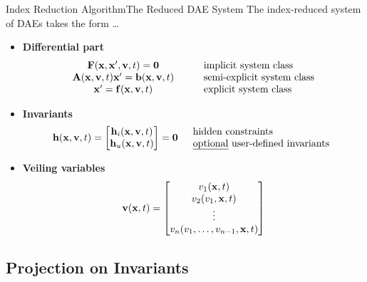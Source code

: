 \begin{frame}{Index Reduction Algorithm}{The Reduced \acs{DAE} System}
  The index-reduced system of \acsp{DAE} takes the form \dots
  \begin{itemize}[<+->]
    \item \textbf{Differential part}
    \begin{equation*}
      \begin{array}{ccl}
          \mathbf{F}(\mathbf{x}, \mathbf{x}^\prime, \mathbf{v}, t) = \mathbf{0} & \quad & \text{implicit  system class} \\
          \mathbf{A}(\mathbf{x}, \mathbf{v}, t) \mathbf{x}^\prime = \mathbf{b}(\mathbf{x}, \mathbf{v}, t) & \quad & \text{semi-explicit system class} \\
          \mathbf{x}^\prime = \mathbf{f}(\mathbf{x}, \mathbf{v}, t) & \quad & \text{explicit system class}
      \end{array}
    \end{equation*}
    \item \textbf{Invariants}
    \begin{equation*}
      \mathbf{h}(\mathbf{x}, \mathbf{v}, t) = \begin{bmatrix}
          \mathbf{h}_{i}(\mathbf{x}, \mathbf{v}, t) \\
          \mathbf{h}_{u}(\mathbf{x}, \mathbf{v}, t)
      \end{bmatrix} = \mathbf{0} \quad \begin{array}{l}
        \text{hidden constraints} \\
        \text{\emph{optional} user-defined invariants}
        \end{array}
    \end{equation*}
    \item \textbf{Veiling variables}
    \begin{equation*}
        \mathbf{v}(\mathbf{x}, t) = \begin{bmatrix}
            v_{1}(\mathbf{x}, t) \\
            v_{2}(v_{1}, \mathbf{x}, t) \\
            \vdots \\
            v_{n}(v_{1}, \dots, v_{n-1}, \mathbf{x}, t)
        \end{bmatrix}
    \end{equation*}
  \end{itemize}
\end{frame}

\subsection{Projection on Invariants}

